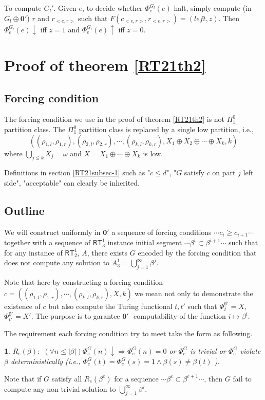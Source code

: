 \documentclass[options]{amsart}
\newtheorem{emphasise}[theorem]{ }
\theoremstyle{definition}
\theoremstyle{remark}
\newtheorem{Ramsey's theorem}[theorem]{Ramsey's theorem}
\begin{document}
To compute $G_l'$. Given $e$, to decide
whether $\Phi_e^{G_l}(e)$ halt,
simply compute (in $G_l\oplus \mathbf{0}'$)
 $r$ and
$r_{<e,r>}$ such that
$F(c_{<e,r>},r_{<e,r>})
=(left, z)$. Then
$\Phi_e^{G_l}(e)\downarrow$
iff $z=1$ and
$\Phi_e^{G_l}(e)\uparrow$
iff $z=0$.

\section{Proof of theorem \ref{RT21th2}}
\subsection{Forcing condition}
The forcing condition we use in
the proof of theorem \ref{RT21th2}
is not $\Pi_1^0$ partition class.
The $\Pi_1^0$ partition class
is replaced by a single
low partition, i.e.,
$$((\rho_{1,l},\rho_{1,r}),
(\rho_{2,l},\rho_{2,r}),\cdots,
(\rho_{k,l},\rho_{k,r}),
X_1\oplus X_2 \oplus\cdots\oplus
X_k, k)$$ where
$\bigcup\limits_{j\leq k}
X_j=\omega$ and
$X=X_1\oplus\cdots\oplus X_k$
is low.

Definitions in section \ref{RT21subsec-1} such as
"$c\leq d$", "$G$ satisfy $c$ on part
$j$ left side", "acceptable"
can clearly be inherited.

\subsection{Outline}

We will construct uniformly in $\mathbf{0}'$
 a sequence of
forcing conditions $\cdots c_i\geq c_{i+1}\cdots$
together with a sequence of
$\mathsf{RT}_3^1$ instance initial segment
$\cdots\beta^i\subset \beta^{i+1}\cdots$
such that for any instance of
$\mathsf{RT}_2^1$, $A$, there exists
$G$ encoded by the forcing condition
that does not compute any solution to
$A_3^1=\bigcup\limits_{j=1}^\infty
\beta^j$.

Note that here
by constructing a forcing condition
$c =((\rho_{1,l},\rho_{1,r}),
\cdots, (\rho_{k,l},\rho_{k,r}),
X, k)$ we mean not only to
demonstrate the existence of
$c$ but also compute
the Turing functional $t,t'$ such
that $\Phi_{t}^{\emptyset'}=X$,
$\Phi_{t'}^{\emptyset'}=X'$.
The purpose is to garantee $\mathbf{0}'$-
computability of the function $i\mapsto \beta^i$.

The requirement each forcing condition try
to meet take the form as following.

\begin{emphasise}\label{RT21emph2}
$R_e(\beta):$
$(\forall n\leq |\beta|)
\Phi_e^G(n)\downarrow\Rightarrow
\Phi_e^G(n) = 0$ or
$
\Phi_e^G$ is trivial
or $\Phi_e^G$ violate
$\beta$
deterministically
(i.e., $\Phi_e^G(t)=
\Phi_e^G(s)=1\wedge \beta(s)\ne \beta(t)$ ).
\end{emphasise}
Note that if $G$ satisfy
all $R_e(\beta^e)$ for
a sequence
$\cdots\beta^e\subset \beta^{e+1}\cdots$,
then $G$ fail to compute any non trivial
solution to
$\bigcup\limits_{j=1}^\infty \beta^j$.
\end{document}
